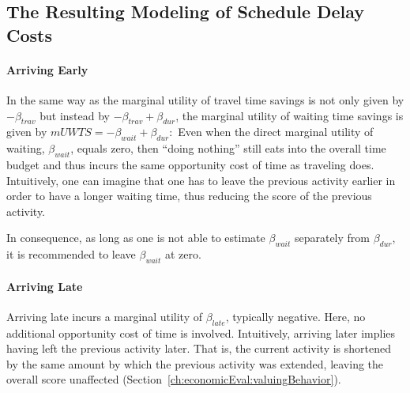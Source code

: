 
\subsection{The Resulting Modeling of Schedule Delay Costs}
\label{sec:schedule-delay-costs}

\paragraph{Arriving Early}

In the same way as the marginal utility of travel time savings is not only given by $- \beta_{trav}$ but instead by $- \beta_{trav} + \beta_{dur}$, the marginal utility of waiting time savings is given by 
$
mUWTS = - \beta_{wait} + \beta_{dur}: 
$
Even when the direct marginal utility of waiting, $\beta_{wait}$, equals zero, then ``doing nothing'' still eats into the overall time budget and thus incurs the same opportunity cost of time as traveling does.  
%
Intuitively, one can imagine that one has to leave the previous activity earlier in order to have a longer waiting time, thus reducing the score of the previous activity.

In consequence, as long as one is not able to estimate $\beta_{wait}$ separately from $\beta_{dur}$, it is recommended to leave $\beta_{wait}$ at zero.

\paragraph{Arriving Late}

Arriving late incurs a marginal utility of $\beta_{late}$, typically negative.  Here, no additional opportunity cost of time is involved. Intuitively, arriving later implies having left the previous activity later.  That is, the current activity is shortened by the same amount by which the previous activity was extended, leaving the overall score unaffected (\cf Section~\ref{ch:economicEval:valuingBehavior}). 


